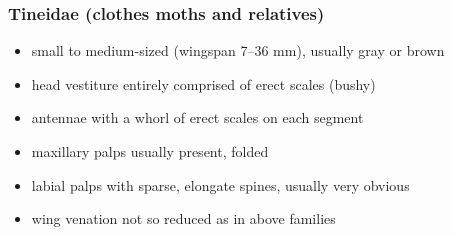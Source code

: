 \documentclass[letterpaper, 11pt]{article}
\begin{document}
\subsubsection{Tineidae (clothes moths and relatives)}
\begin{itemize}
\item small to medium-sized (wingspan 7--36 mm), usually gray or brown
\item head vestiture entirely comprised of erect scales (bushy)
\item antennae with a whorl of erect scales on each segment
\item maxillary palps usually present, folded
\item labial palps with sparse, elongate spines, usually very obvious
\item wing venation not so reduced as in above families
\end{itemize}
\end{document}
